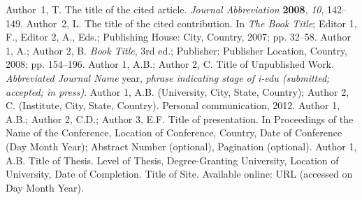 \documentclass[i-edu.uz,journal,article,submit,pdftex,moreauthors]{Definitions/i-edu.uz}
\begin{document}
\begin{sloppypar}






%

\begin{thebibliography}{999}
Author~1, T. The title of the cited article. {\em Journal Abbreviation} {\bf 2008}, {\em 10}, 142--149.
Author~2, L. The title of the cited contribution. In {\em The Book Title}; Editor 1, F., Editor 2, A., Eds.; Publishing House: City, Country, 2007; pp. 32--58.
Author 1, A.; Author 2, B. \textit{Book Title}, 3rd ed.; Publisher: Publisher Location, Country, 2008; pp. 154--196.
Author 1, A.B.; Author 2, C. Title of Unpublished Work. \textit{Abbreviated Journal Name} year, \textit{phrase indicating stage of i-edu (submitted; accepted; in press)}.
Author 1, A.B. (University, City, State, Country); Author 2, C. (Institute, City, State, Country). Personal communication, 2012.
Author 1, A.B.; Author 2, C.D.; Author 3, E.F. Title of presentation. In Proceedings of the Name of the Conference, Location of Conference, Country, Date of Conference (Day Month Year); Abstract Number (optional), Pagination (optional).
Author 1, A.B. Title of Thesis. Level of Thesis, Degree-Granting University, Location of University, Date of Completion.
Title of Site. Available online: URL (accessed on Day Month Year).\\
\end{thebibliography}



\end{sloppypar}
\end{document}
